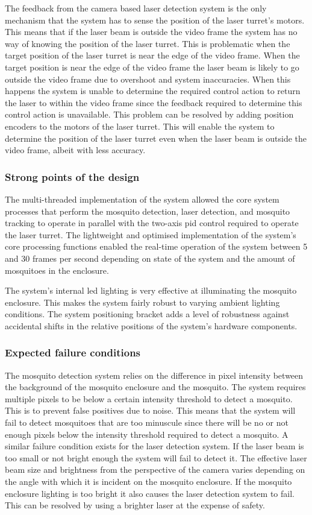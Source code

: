 The feedback from the camera based laser detection system is the only mechanism that the system has to sense the position of the laser turret's motors. This means that if the laser beam is outside the video frame the system has no way of knowing the position of the laser turret. This is problematic when the target position of the laser turret is near the edge of the video frame. When the target position is near the edge of the video frame the laser beam is likely to go outside the video frame due to overshoot and system inaccuracies. When this happens the system is unable to determine the required control action to return the laser to within the video frame since the feedback required to determine this control action is unavailable. This problem can be resolved by adding position encoders to the motors of the laser turret. This will enable the system to determine the position of the laser turret even when the laser beam is outside the video frame, albeit with less accuracy.


\subsubsection{Strong points of the design}
The multi-threaded implementation of the system allowed the core system processes that perform the mosquito detection, laser detection, and mosquito tracking to operate in parallel with the two-axis \gls{pid} control required to operate the laser turret. The lightweight and optimised implementation of the system's core processing functions enabled the real-time operation of the system between 5 and 30 frames per second depending on state of the system and the amount of mosquitoes in the enclosure.

The system's internal \gls{led} lighting is very effective at illuminating the mosquito enclosure. This makes the system fairly robust to varying ambient lighting conditions. The system positioning bracket adds a level of robustness against accidental shifts in the relative positions of the system's hardware components.

\subsubsection{Expected failure conditions}
The mosquito detection system relies on the difference in pixel intensity between the background of the mosquito enclosure and the mosquito. The system requires multiple pixels to be below a certain intensity threshold to detect a mosquito. This is to prevent false positives due to noise. This means that the system will fail to detect mosquitoes that are too minuscule since there will be no or not enough pixels below the intensity threshold required to detect a mosquito. A similar failure condition exists for the laser detection system. If the laser beam is too small or not bright enough the system will fail to detect it. The effective laser beam size and brightness from the perspective of the camera varies depending on the angle with which it is incident on the mosquito enclosure. If the mosquito enclosure lighting is too bright it also causes the laser detection system to fail. This can be resolved by using a brighter laser at the expense of safety.

